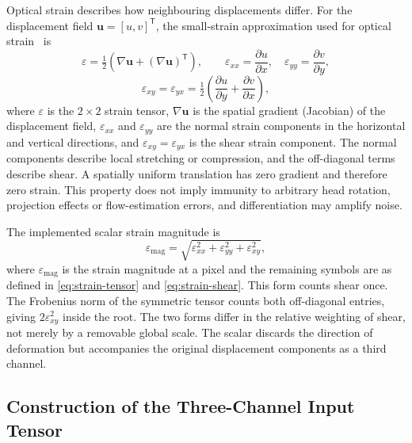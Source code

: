 Optical strain describes how neighbouring displacements differ. For the displacement field $\mathbf{u}=[u,v]^{\mathsf T}$, the small-strain approximation used for optical strain~\cite{shreve2011} is
\begin{equation}
	\varepsilon=\tfrac12\left(\nabla\mathbf{u}
	+(\nabla\mathbf{u})^{\mathsf T}\right),
	\qquad
	\varepsilon_{xx}=\frac{\partial u}{\partial x},\quad
	\varepsilon_{yy}=\frac{\partial v}{\partial y},
	\label{eq:strain-tensor}
\end{equation}
\begin{equation}
	\varepsilon_{xy}=\varepsilon_{yx}
	=\tfrac12\left(\frac{\partial u}{\partial y}
	+\frac{\partial v}{\partial x}\right),
	\label{eq:strain-shear}
\end{equation}
where $\varepsilon$ is the $2\times2$ strain tensor, $\nabla\mathbf{u}$ is the spatial gradient (Jacobian) of the displacement field, $\varepsilon_{xx}$ and $\varepsilon_{yy}$ are the normal strain components in the horizontal and vertical directions, and $\varepsilon_{xy}=\varepsilon_{yx}$ is the shear strain component. The normal components describe local stretching or compression, and the off-diagonal terms describe shear. A spatially uniform translation has zero gradient and therefore zero strain. This property does not imply immunity to arbitrary head rotation, projection effects or flow-estimation errors, and differentiation may amplify noise.

The implemented scalar strain magnitude is
\begin{equation}
	\varepsilon_{\mathrm{mag}}
	=\sqrt{\varepsilon_{xx}^2+\varepsilon_{yy}^2
		+\varepsilon_{xy}^2},
	\label{eq:strain-magnitude}
\end{equation}
where $\varepsilon_{\mathrm{mag}}$ is the strain magnitude at a pixel and the remaining symbols are as defined in \eqref{eq:strain-tensor} and \eqref{eq:strain-shear}. This form counts shear once. The Frobenius norm of the symmetric tensor counts both off-diagonal entries, giving $2\varepsilon_{xy}^2$ inside the root. The two forms differ in the relative weighting of shear, not merely by a removable global scale. The scalar discards the direction of deformation but accompanies the original displacement components as a third channel.

\subsection{Construction of the Three-Channel Input Tensor}
\label{sec:three-channel-tensor}


